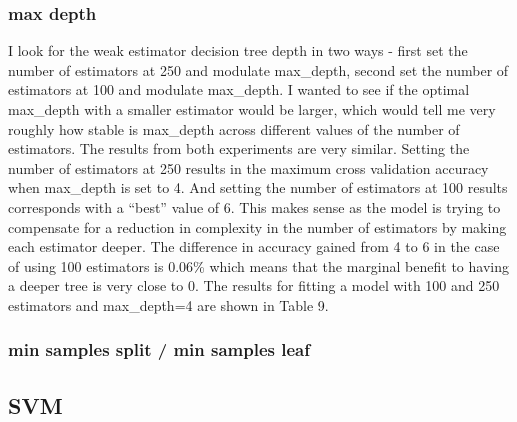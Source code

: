 \documentclass{article}
\begin{document}
\subsubsection*{max depth}
I look for the weak estimator decision tree depth in two ways - first set the number of estimators at 250 and modulate max\_depth, second set the number of estimators at 100 and modulate max\_depth. I wanted to see if the optimal max\_depth with a smaller estimator would be larger, which would tell me very roughly how stable is max\_depth across different values of the number of estimators. The results from both experiments are very similar. Setting the number of estimators at 250 results in the maximum cross validation accuracy when max\_depth is set to 4. And setting the number of estimators at 100 results corresponds with a ``best'' value of 6. This makes sense as the model is trying to compensate for a reduction in complexity in the number of estimators by making each estimator deeper. The difference in accuracy gained from 4 to 6 in the case of using 100 estimators is 0.06\% which means that the marginal benefit to having a deeper tree is very close to 0. The results for fitting a model with 100 and 250 estimators and max\_depth=4 are shown in Table 9. 

\subsubsection*{min samples split / min samples leaf}

\subsection{SVM}
\end{document}
